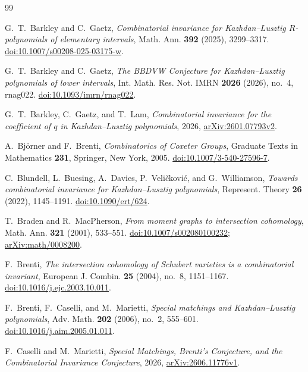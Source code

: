 \begin{thebibliography}{99}
\raggedright

G.~T.~Barkley and C.~Gaetz,
\emph{Combinatorial invariance for Kazhdan--Lusztig $R$-polynomials of elementary intervals},
Math. Ann. \textbf{392} (2025), 3299--3317.
\href{https://doi.org/10.1007/s00208-025-03175-w}{doi:10.1007/s00208-025-03175-w}.

G.~T.~Barkley and C.~Gaetz,
\emph{The BBDVW Conjecture for Kazhdan--Lusztig polynomials of lower intervals},
Int. Math. Res. Not. IMRN \textbf{2026} (2026), no.~4, rnag022.
\href{https://doi.org/10.1093/imrn/rnag022}{doi:10.1093/imrn/rnag022}.

G.~T.~Barkley, C.~Gaetz, and T.~Lam,
\emph{Combinatorial invariance for the coefficient of $q$ in
Kazhdan--Lusztig polynomials},
2026, \href{https://arxiv.org/abs/2601.07793v2}{arXiv:2601.07793v2}.

A.~Bj\"orner and F.~Brenti,
\emph{Combinatorics of Coxeter Groups},
Graduate Texts in Mathematics \textbf{231}, Springer, New York, 2005.
\href{https://doi.org/10.1007/3-540-27596-7}{doi:10.1007/3-540-27596-7}.

C.~Blundell, L.~Buesing, A.~Davies, P.~Veli\v{c}kovi\'{c}, and G.~Williamson,
\emph{Towards combinatorial invariance for Kazhdan--Lusztig polynomials},
Represent. Theory \textbf{26} (2022), 1145--1191.
\href{https://doi.org/10.1090/ert/624}{doi:10.1090/ert/624}.

T.~Braden and R.~MacPherson,
\emph{From moment graphs to intersection cohomology},
Math. Ann. \textbf{321} (2001), 533--551.
\href{https://doi.org/10.1007/s002080100232}{doi:10.1007/s002080100232};
\href{https://arxiv.org/abs/math/0008200}{arXiv:math/0008200}.

F.~Brenti,
\emph{The intersection cohomology of Schubert varieties is a combinatorial invariant},
European J. Combin. \textbf{25} (2004), no.~8, 1151--1167.
\href{https://doi.org/10.1016/j.ejc.2003.10.011}{doi:10.1016/j.ejc.2003.10.011}.

F.~Brenti, F.~Caselli, and M.~Marietti,
\emph{Special matchings and Kazhdan--Lusztig polynomials},
Adv. Math. \textbf{202} (2006), no.~2, 555--601.
\href{https://doi.org/10.1016/j.aim.2005.01.011}{doi:10.1016/j.aim.2005.01.011}.

F.~Caselli and M.~Marietti,
\emph{Special Matchings, Brenti's Conjecture, and the Combinatorial
Invariance Conjecture},
2026, \href{https://arxiv.org/abs/2606.11776v1}{arXiv:2606.11776v1}.


\end{thebibliography}
